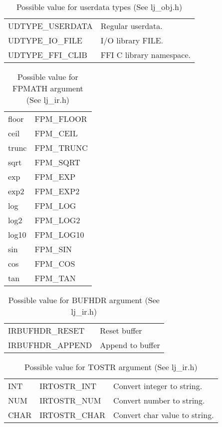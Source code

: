 \begin{table}[H]
\centering
\caption{
  Possible value for userdata types (See lj\_obj.h)
}
\label{tab:dump-udata}
\begin{tabular}{|l|l|}
\hline
UDTYPE\_USERDATA  & Regular userdata.\\
UDTYPE\_IO\_FILE  & I/O library FILE.\\
UDTYPE\_FFI\_CLIB & FFI C library namespace.\\\hline
\end{tabular}
\end{table}

\begin{table}[H]
\centering
\caption{
  Possible value for FPMATH argument (See lj\_ir.h)
}
\label{tab:dump-fpmath}
\begin{tabular}{|l|l|}
\hline
floor & FPM\_FLOOR \\
ceil  & FPM\_CEIL  \\
trunc & FPM\_TRUNC \\
sqrt  & FPM\_SQRT  \\
exp   & FPM\_EXP   \\
exp2  & FPM\_EXP2  \\
log   & FPM\_LOG   \\
log2  & FPM\_LOG2  \\
log10 & FPM\_LOG10 \\
sin   & FPM\_SIN   \\
cos   & FPM\_COS   \\
tan   & FPM\_TAN   \\
\hline
\end{tabular}
\end{table}

\begin{table}[H]
\centering
\caption{
  Possible value for BUFHDR argument (See lj\_ir.h)
}
\label{tab:dump-bufhdr}
\begin{tabular}{|l|l|}
\hline
IRBUFHDR\_RESET  & Reset buffer \\
IRBUFHDR\_APPEND & Append to buffer \\
\hline
\end{tabular}
\end{table}

\begin{table}[H]
\centering
\caption{
  Possible value for TOSTR argument (See lj\_ir.h)
}
\label{tab:dump-tostr}
\begin{tabular}{|l|l|l|}
\hline
INT  & IRTOSTR\_INT  & Convert integer to string.  \\
NUM  & IRTOSTR\_NUM  & Convert number to string.  \\
CHAR & IRTOSTR\_CHAR & Convert char value to string.  \\\hline
\end{tabular}
\end{table}


